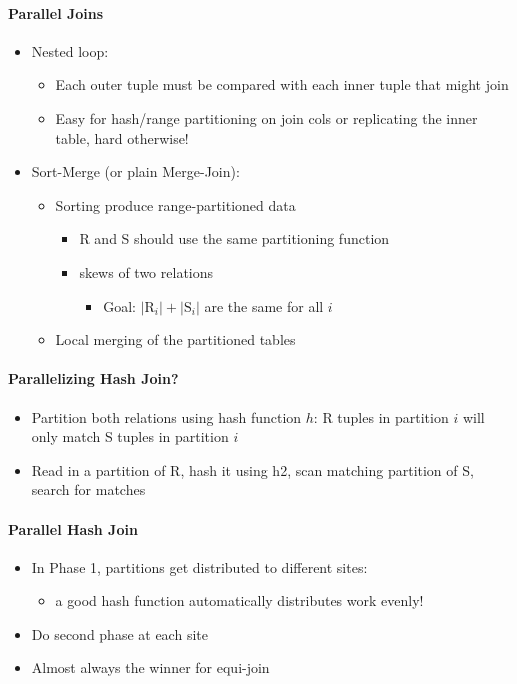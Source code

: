 \paragraph{Parallel Joins}
\begin{itemize}
\item Nested loop:
  \begin{itemize}
  \item Each outer tuple must be compared with each inner tuple that
    might join
  \item Easy for hash/range partitioning on join cols or
    replicating the inner table, hard otherwise!
  \end{itemize}

\item Sort-Merge (or plain Merge-Join):
  \begin{itemize}
  \item Sorting produce range-partitioned data
    \begin{itemize}
    \item R and S should use the same partitioning function
    \item skews of two relations
      \begin{itemize}
      \item Goal: $|\text{R}_i| + |\text{S}_i|$ are the same for all $i$
      \end{itemize}
    \end{itemize}
  \item Local merging of the partitioned tables
  \end{itemize}
\end{itemize}

\paragraph{Parallelizing Hash Join?}
\begin{itemize}
\item Partition both relations using hash function $h$:
  R tuples in partition $i$ will only match S tuples in
  partition $i$
\item Read in a partition of R, hash it using h2, scan
  matching partition of S, search for matches
\end{itemize}


\paragraph{Parallel Hash Join}
\begin{itemize}
\item In Phase 1, partitions get distributed to different sites:
  \begin{itemize}
  \item a good hash function automatically distributes work evenly!
  \end{itemize}

\item Do second phase at each site
\item Almost always the winner for equi-join
\end{itemize}

